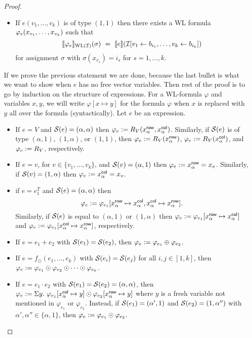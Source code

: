 \begin{proof}
\begin{itemize}
	\item If $e(v_1,\ldots,v_k)$ is of type $(1,1)$ then there exists a WL formula $\varphi_e( x_{v_1}, \ldots, x_{v_k})$ such that
	$$
	\ssem{\varphie}{\text{WL}(\I)}(\sigma) \ = \ \sem{e}{\I[v_1\gets b_{i_1},\ldots,v_k\gets b_{i_k}]}
	$$
	for assignment $\sigma$ with $\sigma(x_{v_s})=i_s$ for $s=1,\ldots, k$.
\end{itemize}
If we prove the previous statement we are done, because the last bullet is what we want to show when $e$ has no free vector variables. 
Then rest of the proof is to go by induction on the structure of \langprod expressions.
For a WL-formula $\varphi$ and variables $x,y$, we will write  $\varphi[x \mapsto y]$ for the formula $\varphi$ when $x$ is replaced with $y$ all over the formula (syntactically).
Let $e$ be an \langprod expression.
\begin{itemize} \itemsep3mm
  \item If $e=V$ and $\mathcal{S}(e)= (\alpha, \alpha)$ then $\varphi_e:=R_V(x_{\alpha}^{\mathsf{row}}, x_{\alpha}^{\mathsf{col}})$. Similarly, if $\mathcal{S}(e)$ is of type $(\alpha,1)$, $(1, \alpha)$, or $(1,1)$, then $\varphi_e:=R_V(x_{\alpha}^{\mathsf{row}})$, $\varphi_e:=R_V(x_{\alpha}^{\mathsf{col}})$, and $\varphi_e:=R_V$, respectively.
  
  \item If $e=v$, for $v\in \{v_1,\ldots ,v_k\}$, and $\mathcal{S}(v)= (\alpha,1)$ then $\varphi_e := x_{\alpha}^{\mathsf{row}} = x_v$. Similarly, if $\mathcal{S}(v)= (1,\alpha)$ then $\varphi_e := x_{\alpha}^{\mathsf{col}} = x_v$.
  
  \item if $e= e_1^T$ and $\mathcal{S}(e)=(\alpha,\alpha)$ then
  $$
  \varphi_e:= \varphi_{e_1}[x_{\alpha}^{\mathsf{row}} \mapsto x_{\alpha}^{\mathsf{col}}, x_{\alpha}^{\mathsf{col}} \mapsto x_{\alpha}^{\mathsf{row}}].
  $$
  Similarly, if $\mathcal{S}(e)$ is equal to $(\alpha,1)$ or $(1,\alpha)$ then $\varphi_e:=\varphi_{e_1}[x_{\alpha}^{\mathsf{row}} \mapsto x_{\alpha}^{\mathsf{col}}]$ and $\varphi_e:=\varphi_{e_1}[x_{\alpha}^{\mathsf{col}} \mapsto x_{\alpha}^{\mathsf{row}}]$, respectively.   


	\item If $e=e_1+e_2$ with $\mathcal{S} (e_1)=\mathcal{S} (e_2)$, then $\varphi_e:= \varphi_{e_1} \oplus \varphi_{e_2}$.
	
	\item If $e=f_\odot(e_1,\ldots, e_k)$ with $\mathcal{S}(e_i)=\mathcal{S}(e_j)$ for all $i,j\in[1,k]$, then $\varphi_e:= \varphi_{e_1} \odot \varphi_{e_2} \odot \cdots \odot \varphi_{e_k}$.
	
	\item If $e=e_1\cdot e_2$ with $\mathcal{S} (e_1)=\mathcal{S} (e_2)=(\alpha, \alpha)$,  then $\varphi_e:= \Sigma y. \  \varphi_{e_1}[x_{\alpha}^{\mathsf{col}} \mapsto y] \odot \varphi_{e_2}[x_{\alpha}^{\mathsf{row}} \mapsto y]$ where $y$ is a fresh variable not mentioned in $\varphi_{e_1}$ or $\varphi_{e_2}$. Instead, if $\mathcal{S} (e_1)= (\alpha', 1)$ and $\mathcal{S} (e_2)=(1, \alpha'')$ with $\alpha', \alpha'' \in \{\alpha, 1\}$, then $\varphi_e := \varphi_{e_1} \odot \varphi_{e_2}$.
	

\end{itemize}
\end{proof}
